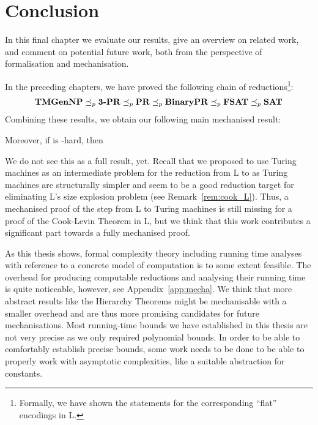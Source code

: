 \chapter{Conclusion}\label{chap:conclusion}
In this final chapter we evaluate our results, give an overview on related work, and comment on potential future work, both from the perspective of formalisation and mechanisation.

In the preceding chapters, we have proved the following chain of reductions\footnote{Formally, we have shown the statements for the corresponding ``flat'' encodings in L.}:
\begin{align*}
  \textbf{TMGenNP} \preceq_p{} \textbf{3-PR} \preceq_p{} \textbf{PR} \preceq_p{} \textbf{BinaryPR} \preceq_p{} \normalfont\textbf{FSAT}{} \preceq_p{} \normalfont\textbf{SAT}{} 
\end{align*}
Combining these results, we obtain our following main mechanised result:
\begin{theorem}
   Moreover, if \gennp{} is \NP{}-hard, then 
\end{theorem}
We do not see this as a full result, yet. Recall that we proposed to use Turing machines as an intermediate problem for the reduction from L to \SAT{} as Turing machines are structurally simpler and seem to be a good reduction target for eliminating L's size explosion problem (see Remark~\ref{rem:cook_L}).
Thus, a mechanised proof of the step from L to Turing machines is still missing for a proof of the Cook-Levin Theorem in L, but we think that this work contributes a significant part towards a fully mechanised proof.

As this thesis shows, formal complexity theory including running time analyses with reference to a concrete model of computation is to some extent feasible. The overhead for producing computable reductions and analysing their running time is quite noticeable, however, see Appendix~\ref{app:mecha}. 
We think that more abstract results like the Hierarchy Theorems might be mechanisable with a smaller overhead and are thus more promising candidates for future mechanisations.
Most running-time bounds we have established in this thesis are not very precise as we only required polynomial bounds. In order to be able to comfortably establish precise bounds, some work needs to be done to be able to properly work with asymptotic complexities, like a suitable abstraction for constants. 

